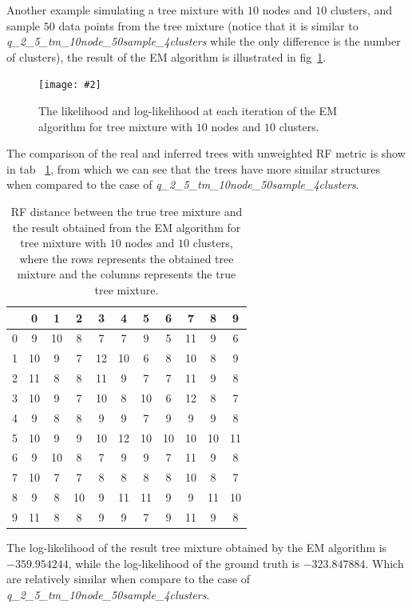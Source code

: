 \documentclass[11pt]{extarticle}
\newcommand{\0}{\mathbf{0}}
\renewcommand{\(}{\left(}
\renewcommand{\)}{\right)}
\theoremstyle{definition}
\newcommand{\image}[3]{
	\begin{figure}[!ht]
		\centering
	    \texttt{[image: \#2]}
		\caption{#3}
		\label{fig:#2}
	\end{figure}
}
\begin{document}
\par Another example simulating a tree mixture with $10$ nodes and $10$ clusters, and sample $50$ data points from the tree mixture (notice that it is similar to \textit{q\_2\_5\_tm\_10node\_50sample\_4clusters} while the only difference is the number of clusters), the result of the EM algorithm is illustrated in fig~\ref{fig:D10_N50_K10}.
	\image{0.9}{D10_N50_K10}{The likelihood and log-likelihood at each iteration of the EM algorithm for tree mixture with $10$ nodes and $10$ clusters.}
	\par The comparison of the real and inferred trees with unweighted RF metric is show in tab~ \ref{tab:RF_D10_N50_K10}, from which we can see that the trees have more similar structures when compared to the case of \textit{q\_2\_5\_tm\_10node\_50sample\_4clusters}.
	\begin{table}[!ht]
		\centering
		\caption{RF distance between the true tree mixture and the result obtained from the EM algorithm for tree mixture with $10$ nodes and $10$ clusters, where the rows represents the obtained tree mixture and the columns represents the true tree mixture.}
		\begin{tabular}{c|cccccccccc}
			 & 0 & 1 & 2 & 3 & 4 & 5 & 6 & 7 & 8 & 9 \\
\hline
0 & 9 & 10 & 8 & 7 & 7 & 9 & 5 & 11 & 9 & 6 \\
1 & 10 & 9 & 7 & 12 & 10 & 6 & 8 & 10 & 8 & 9 \\
2 & 11 & 8 & 8 & 11 & 9 & 7 & 7 & 11 & 9 & 8 \\
3 & 10 & 9 & 7 & 10 & 8 & 10 & 6 & 12 & 8 & 7 \\
4 & 9 & 8 & 8 & 9 & 9 & 7 & 9 & 9 & 9 & 8 \\
5 & 10 & 9 & 9 & 10 & 12 & 10 & 10 & 10 & 10 & 11 \\
6 & 9 & 10 & 8 & 7 & 9 & 9 & 7 & 11 & 9 & 8 \\
7 & 10 & 7 & 7 & 8 & 8 & 8 & 8 & 10 & 8 & 7 \\
8 & 9 & 8 & 10 & 9 & 11 & 11 & 9 & 9 & 11 & 10\\
9 & 11 & 8 & 8 & 9 & 9 & 7 & 9 & 11 & 9 & 8
		\end{tabular}
		\label{tab:RF_D10_N50_K10}
	\end{table}
	\par The log-likelihood of the result tree mixture obtained by the EM algorithm is $-359.954244$, while the log-likelihood of the ground truth is $-323.847884$. Which are relatively similar when compare to the case of \textit{q\_2\_5\_tm\_10node\_50sample\_4clusters}.
\end{document}
